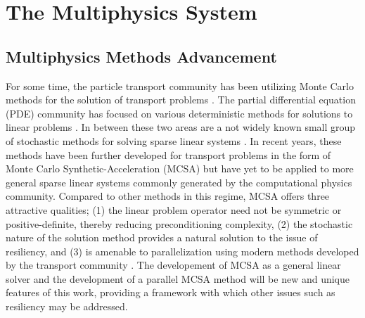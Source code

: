 \section{The Multiphysics System}
\label{sec:multiphysics_system}

\subsection{Multiphysics Methods Advancement}
\label{subsec:methods_advancement}
For some time, the particle transport community has been utilizing
Monte Carlo methods for the solution of transport problems
\citep{lewis_computational_1993}. The partial differential equation
(PDE) community has focused on various deterministic methods for
solutions to linear problems \citep{saad_iterative_2003,
  kelley_iterative_1995}. In between these two areas are a not widely
known small group of stochastic methods for solving sparse linear
systems \citep{forsythe_matrix_1950, hammersley_monte_1964,
  halton_sequential_1962, halton_sequential_1994}. In recent years,
these methods have been further developed for transport problems in
the form of Monte Carlo Synthetic-Acceleration (MCSA)
\citep{evans_residual_2003, evans_monte_2009, evans_monte_2012} but
have yet to be applied to more general sparse linear systems commonly
generated by the computational physics community. Compared to other
methods in this regime, MCSA offers three attractive qualities; (1)
the linear problem operator need not be symmetric or
positive-definite, thereby reducing preconditioning complexity, (2)
the stochastic nature of the solution method provides a natural
solution to the issue of resiliency, and (3) is amenable to
parallelization using modern methods developed by the transport
community \citep{wagner_hybrid_2010}. The developement of MCSA as a
general linear solver and the development of a parallel MCSA method
will be new and unique features of this work, providing a framework
with which other issues such as resiliency may be addressed.

